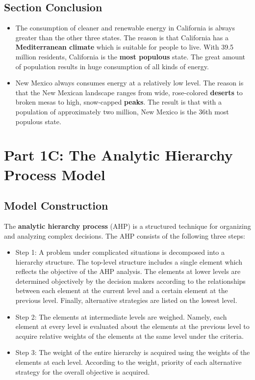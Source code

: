 \documentclass{mcmthesis}
\begin{document}
\subsection{Section Conclusion}

\begin{itemize}
\item The consumption of cleaner and renewable energy in California is always greater than the other three states. The reason is that California has a {\bf{Mediterranean climate}} which is suitable for people to live. With 39.5 million residents, California is the {\bf{most populous}} state. The great amount of population results in huge consumption of all kinds of energy\cite{California}.
\item New Mexico always consumes energy at a relatively low level. The reason is that the New Mexican landscape ranges from wide, rose-colored {\bf{deserts}} to broken mesas to high, snow-capped {\bf{peaks}}. The result is that with a population of approximately two million, New Mexico is the 36th most populous state\cite{NewMexico}. 
\end{itemize}

\section{Part 1C: The Analytic Hierarchy Process Model}

\subsection{Model Construction}

The {\bf{analytic hierarchy process}} (AHP) is a structured technique for organizing and analyzing complex decisions. The AHP consists of the following three steps\cite{Wan2009Application,Carlsson1995AHP}:

\begin{itemize}
\item Step 1: A problem under complicated situations is decomposed into a hierarchy structure. The top-level structure includes a single element which reflects the objective of the AHP analysis. The elements at lower levels are determined objectively by the decision makers according to the relationships between each element at the current level and a certain element at the previous level. Finally, alternative strategies are listed on the lowest level.

\item Step 2: The elements at intermediate levels are weighed. Namely, each element at every level is evaluated about the elements at the previous level to acquire relative weights of the elements at the same level under the criteria.

\item Step 3: The weight of the entire hierarchy is acquired using the weights of the elements at each level. According to the weight, priority of each alternative strategy for the overall objective is acquired.
\end{itemize}
\end{document}
